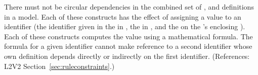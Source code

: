 There must not be circular dependencies in the combined set of
\InitialAssignment, \AssignmentRule and \KineticLaw definitions in a model.
Each of these constructs has the effect of assigning a value to an
identifier (\ie the identifier given in the   in
\InitialAssignment, the   in \AssignmentRule, and the
  on the \KineticLaw's enclosing \Reaction).  Each of these
constructs computes the value using a mathematical formula.  The formula
for a given identifier cannot make reference to a second identifier whose
own definition depends directly or indirectly on the first identifier.
(References: L2V2 Section~\ref{sec:ruleconstraints}.)
